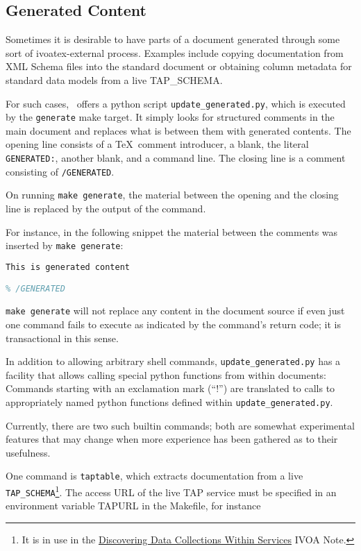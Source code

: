 \documentclass[11pt,a4paper]{ivoa}
\begin{document}
\subsection{Generated Content}
\label{sect:generated}

Sometimes it is desirable to have parts of a document generated through
some sort of ivoatex-external process.  Examples include copying
documentation from XML Schema files into the standard document 
or obtaining column metadata for standard
data models from a live TAP\_SCHEMA.

For such cases, \ivoatex\ offers a python script
\texttt{update\_generated.py}, which is executed by the
\texttt{generate} make target.  It simply looks for structured comments
in the main document and replaces what is between them with generated
contents.  The opening line consists of a \TeX~comment introducer, a
blank, the literal \texttt{GENERATED:}, another blank, and a command
line.  The closing line is a comment consisting of \texttt{/GENERATED}.

On running \texttt{make generate}, the material between the opening and
the closing line is replaced by the output of the command.

For instance, in the following snippet the material between the comments
was inserted by \texttt{make generate}:

\begin{lstlisting}[language=TeX]
% GENERATED: echo This is generated content
This is generated content

% /GENERATED
\end{lstlisting}

\texttt{make generate} will not replace any content in the document source
if even just one command fails to execute as indicated by the
command's return code; it is transactional in this sense.

In addition to allowing arbitrary shell
commands, \texttt{update\_generated.py} has a facility that allows
calling special python functions from within documents: Commands
starting with an exclamation mark (``!'') are translated to calls to
appropriately named python functions defined within
\texttt{update\_generated.py}.

Currently, there are two such builtin commands; both are somewhat
experimental features that may change when more experience has been
gathered as to their usefulness.

One command is \texttt{taptable}, which extracts documentation from a
live \texttt{TAP\_SCHEMA}\footnote{It is in use in the
\href{https://volute.g-vo.org/svn/trunk/projects/registry/discovercollections}{Discovering
Data Collections Within Services} IVOA Note.}.  The access URL of the
live TAP service must be specified in an environment variable TAPURL in
the Makefile, for instance
\end{document}
